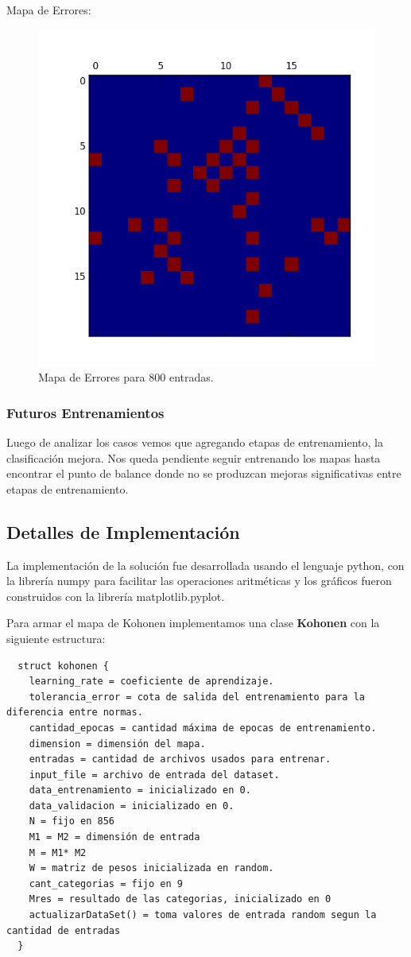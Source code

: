 Mapa de Errores:


\begin{figure}[H]
  \centering
  \includegraphics[width=0.5\columnwidth]{secciones/graficos/kohonen/mapaerroresmejor.png}
  \caption{Mapa de Errores para 800 entradas.}
  \label{fig:mapa errores 800}
\end{figure}



\subsubsection{Futuros Entrenamientos}

Luego de analizar los casos vemos que agregando etapas de entrenamiento, la clasificación mejora.
Nos queda pendiente seguir entrenando los mapas hasta encontrar el punto de balance donde no se
produzcan mejoras significativas entre etapas de entrenamiento.


\subsection{Detalles de Implementación}

La implementación de la solución fue desarrollada usando el lenguaje python,
con la librería numpy para facilitar las operaciones aritméticas y los gráficos
fueron construidos con la librería matplotlib.pyplot.

Para armar el mapa de Kohonen implementamos una clase \textbf{Kohonen} con la siguiente estructura:

\begin{lstlisting}
  struct kohonen {
    learning_rate = coeficiente de aprendizaje.
    tolerancia_error = cota de salida del entrenamiento para la diferencia entre normas.
    cantidad_epocas = cantidad máxima de epocas de entrenamiento.
    dimension = dimensión del mapa.
    entradas = cantidad de archivos usados para entrenar.
    input_file = archivo de entrada del dataset.
    data_entrenamiento = inicializado en 0.
    data_validacion = inicializado en 0.
    N = fijo en 856
    M1 = M2 = dimensión de entrada
    M = M1* M2 
    W = matriz de pesos inicializada en random.  
    cant_categorias = fijo en 9
    Mres = resultado de las categorias, inicializado en 0
    actualizarDataSet() = toma valores de entrada random segun la cantidad de entradas
  }
\end{lstlisting}

